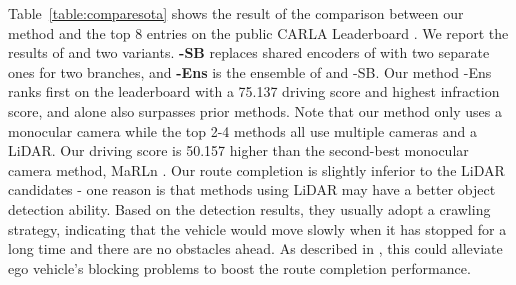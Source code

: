 \documentclass{article}
\begin{document}
Table~\ref{table:comparesota} shows the result of the comparison between our method and the top 8 entries on the public CARLA Leaderboard \citep{carlaleaderboard}. We report the results of \algname and two variants. \textbf{\algname-SB} replaces shared encoders of \algname with two separate ones for two branches, and \textbf{\algname-Ens} is the ensemble of \algname and \algname-SB.
Our method \algname-Ens ranks first on the leaderboard with a 75.137 driving score and highest infraction score, and \algname alone also surpasses prior methods.
Note that our method only uses a monocular camera while the top 2-4 methods all use multiple cameras and a LiDAR. Our driving score is 50.157 higher than the second-best monocular camera method, MaRLn \citep{toromanoff2020modelfreerl}.
Our route completion is slightly inferior to the LiDAR candidates - one reason is that methods using LiDAR may have a better object detection ability. Based on the detection results, they usually adopt a crawling strategy, indicating that the vehicle would move slowly when it has stopped for a long time and there are no obstacles ahead. As described in \citep{jaeger2021transfuser+}, this could alleviate ego vehicle's blocking problems to boost the route completion performance.
\end{document}
